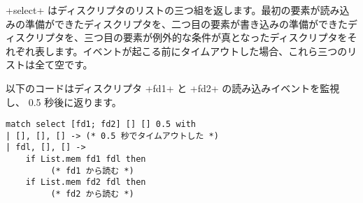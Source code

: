 \ml+select+ はディスクリプタのリストの三つ組を返します。最初の要素が読み込みの準備ができたディスクリプタを、二つ目の要素が書き込みの準備ができたディスクリプタを、三つ目の要素が例外的な条件が真となったディスクリプタをそれぞれ表します。イベントが起こる前にタイムアウトした場合、これら三つのリストは全て空です。

\begin{example}
以下のコードはディスクリプタ \ml+fd1+ と \ml+fd2+ の読み込みイベントを監視し、 0.5 秒後に返ります。
\begin{lstlisting}
match select [fd1; fd2] [] [] 0.5 with
| [], [], [] -> (* 0.5 秒でタイムアウトした *)
| fdl, [], [] ->
    if List.mem fd1 fdl then
         (* fd1 から読む *)
    if List.mem fd2 fdl then
         (* fd2 から読む *)
\end{lstlisting}
\end{example}

